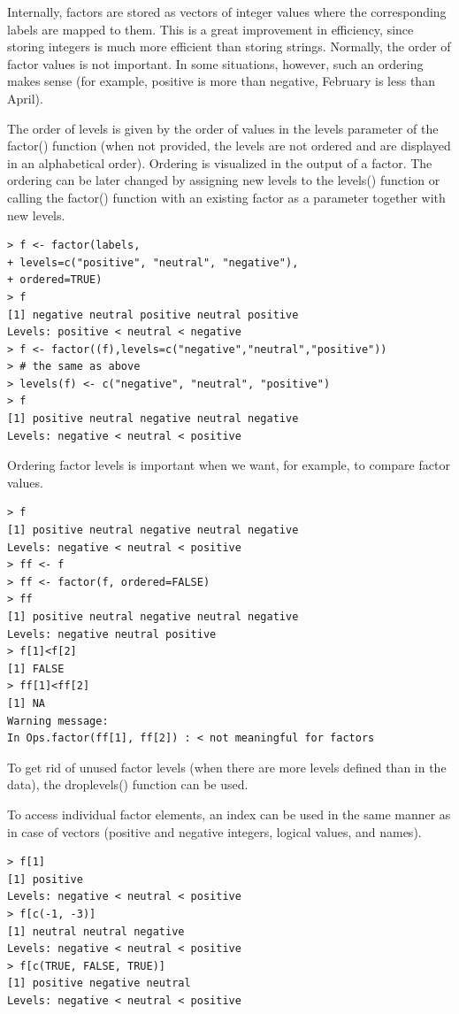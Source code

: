 \documentclass[11pt,openany,executivepaper]{book}
\begin{document}
Internally, factors are stored as vectors of integer values where the corresponding labels are mapped to them. This is a great improvement in efficiency, since storing integers is much more efficient than storing strings. Normally, the order of factor values is not important. In some situations, however, such an ordering makes sense (for example, positive is more than negative, February is less than April).

The order of levels is given by the order of values in the levels parameter of the factor() function (when not provided, the levels are not ordered and are displayed in an alphabetical order). Ordering is visualized in the output of a factor. The ordering can be later changed by assigning new levels to the levels() function or calling the factor() function with an existing factor as a parameter together with new levels.

\begin{verbatim}
> f <- factor(labels,
+ levels=c("positive", "neutral", "negative"),
+ ordered=TRUE)
> f
[1] negative neutral positive neutral positive
Levels: positive < neutral < negative
> f <- factor((f),levels=c("negative","neutral","positive"))
> # the same as above
> levels(f) <- c("negative", "neutral", "positive")
> f
[1] positive neutral negative neutral negative
Levels: negative < neutral < positive
\end{verbatim}

Ordering factor levels is important when we want, for example, to compare factor values.

\begin{verbatim}
> f
[1] positive neutral negative neutral negative
Levels: negative < neutral < positive
> ff <- f
> ff <- factor(f, ordered=FALSE)
> ff
[1] positive neutral negative neutral negative
Levels: negative neutral positive
> f[1]<f[2]
[1] FALSE
> ff[1]<ff[2]
[1] NA
Warning message:
In Ops.factor(ff[1], ff[2]) : < not meaningful for factors
\end{verbatim}

To get rid of unused factor levels (when there are more levels defined than in the data), the droplevels() function can be used.

To access individual factor elements, an index can be used in the same manner as in case of vectors (positive and negative integers, logical values, and names).

\begin{verbatim}
> f[1]
[1] positive
Levels: negative < neutral < positive
> f[c(-1, -3)]
[1] neutral neutral negative
Levels: negative < neutral < positive
> f[c(TRUE, FALSE, TRUE)]
[1] positive negative neutral
Levels: negative < neutral < positive
\end{verbatim}
\end{document}
